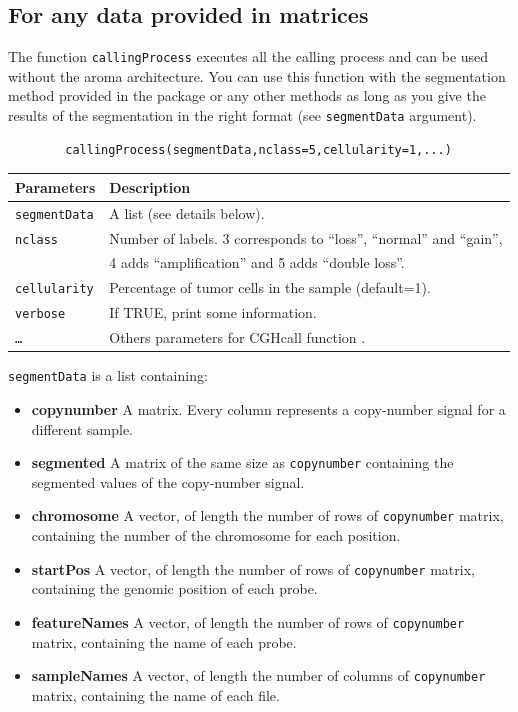 \documentclass[a4paper,10pt]{article}
\begin{document}
	
	\subsection{For any data provided in matrices}\label{calling}
	
		The function \texttt{callingProcess} executes all the calling process and can be used without the aroma architecture. You can use this function with the segmentation method provided in the package or any other methods as long as you give the results of the segmentation in the right format (see \texttt{segmentData} argument).
	
		\begin{verbatim}	
		callingProcess(segmentData,nclass=5,cellularity=1,...)
		\end{verbatim}
	
		\begin{center}
			\begin{tabular}{|l|l|}
				\hline
				Parameters & Description\\
				\hline
				\texttt{segmentData} & A list (see details below).\\
				\texttt{nclass} & Number of labels. 3 corresponds to ``loss'', ``normal'' and ``gain'', \\
				~ & 4 adds ``amplification'' and 5 adds ``double loss''.\\
				\texttt{cellularity} & Percentage of tumor cells in the sample (default=1).\\
				\texttt{verbose} & If TRUE, print some information.\\
				\texttt{\dots} & Others parameters for CGHcall function \cite{CGHcallR}.\\
				\hline	
			\end{tabular}		
		\end{center}
		
	
		
		\texttt{segmentData} is a list containing:
		\begin{itemize}
			\item \textbf{copynumber} A matrix. Every column represents a copy-number signal for a different sample.
			\item \textbf{segmented} A matrix of the same size as \texttt{copynumber} containing the segmented values of the copy-number signal.
			\item \textbf{chromosome} A vector, of length the number of rows of \texttt{copynumber} matrix, containing the number of the chromosome for each position.
			\item \textbf{startPos} A vector, of length the number of rows of \texttt{copynumber} matrix, containing the genomic position of each probe.
			\item \textbf{featureNames} A vector, of length the number of rows of \texttt{copynumber} matrix, containing the name of each probe.
			\item \textbf{sampleNames} A vector, of length the number of columns of \texttt{copynumber} matrix, containing the name of each file.
		\end{itemize}
\end{document}
